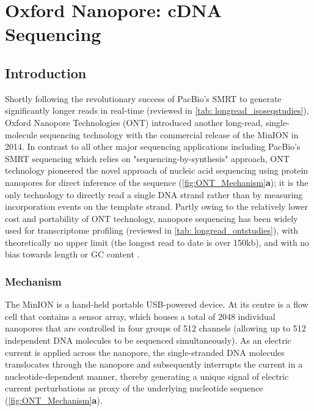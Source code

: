 \clearpage

\section{Oxford Nanopore: cDNA Sequencing}

\subsection{Introduction}
Shortly following the revolutionary success of PacBio's SMRT to generate significantly longer reads in real-time (reviewed in \cref{tab: longread_isoseqstudies}), Oxford Nanopore Technologies (ONT) introduced another long-read, single-molecule sequencing technology with the commercial release of the MinION in 2014. In contrast to all other major sequencing applications including PacBio's SMRT sequencing which relies on "sequencing-by-synthesis" approach, ONT technology pioneered the novel approach of nucleic acid sequencing using protein nanopores for direct inference of the sequence (\cref{fig:ONT_Mechanism}\textbf{a}); it is the only technology to directly read a single DNA strand rather than by measuring incorporation events on the template strand\cite{Jain2015}. Partly owing to the relatively lower cost and portability of ONT technology, nanopore sequencing has been widely used for transcriptome profiling (reviewed in \cref{tab: longread_ontstudies}), 
with theoretically no upper limit \cite{Loman2015} (the longest read to date is over 150kb), and with no bias towards length or GC content \cite{Oikonomopoulos2016, Weirather2017}.


\subsubsection{Mechanism}
The MinION is a hand-held portable USB-powered device. At its centre is a flow cell that contains a sensor array, which houses a total of 2048 individual nanopores that are controlled in four groups of 512 channels (allowing up to 512 independent DNA molecules to be sequenced simultaneously)\cite{Jain2015}. As an electric current is applied across the nanopore, the single-stranded DNA molecules translocates through the nanopore and subsequently interrupts the current in a nucleotide-dependent manner, thereby generating a unique signal of electric current perturbations as proxy of the underlying nucleotide sequence (\cref{fig:ONT_Mechanism}\textbf{a}). 

